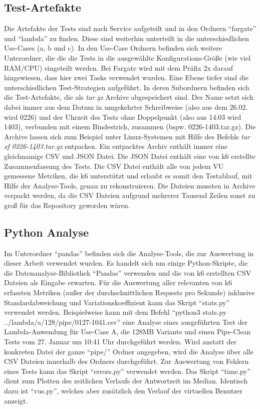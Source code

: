 \subsection{Test-Artefakte}
Die Artefakte der Tests sind nach Service aufgeteilt und in den Ordnern "`fargate"' und "`lambda"' zu finden. Diese sind weiterhin unterteilt in die unterschiedlichen Use-Cases (a, b und c). In den Use-Case Ordnern befinden sich weitere Unterordner, die die die Tests in die ausgewählte Konfigurations-Größe (wie viel RAM/CPU) eingeteilt werden. Bei Fargate wird mit dem Präfix 2x darauf hingewiesen, dass hier zwei Tasks verwendet wurden. Eine Ebene tiefer sind die unterschiedlichen Test-Strategien aufgeführt. In deren Subordnern befinden sich die Test-Artefakte, die als \textit{tar.gz} Archive abgespeichert sind. Der Name setzt sich dabei immer aus dem Datum in umgekehrter Schreibweise (also aus dem 26.02. wird 0226) und der Uhrzeit des Tests ohne Doppelpunkt (also aus 14:03 wird 1403), verbunden mit einem Bindestrich, zusammen (bspw. 0226-1403.tar.gz). Die Archive lassen sich zum Beispiel unter Linux-Systemen mit Hilfe des Befehls \textit{tar xf 0226-1403.tar.gz} entpacken. Ein entpacktes Archiv enthält immer eine gleichnamige \ac{CSV} und JSON Datei. Die JSON Datei enthält eine von k6 erstellte Zusammenfassung des Tests. Die \ac{CSV} Datei enthält alle von jedem \ac{VU} gemessene Metriken, die k6 unterstützt und erlaubt es somit den Testablauf, mit Hilfe der Analyse-Tools, genau zu rekonstruieren. Die Dateien mussten in Archive verpackt werden, da die \ac{CSV} Dateien aufgrund mehrerer Tausend Zeilen sonst zu groß für das Repository geworden wären.

\subsection{Python Analyse} \label{subsec:pandas}
Im Unterordner "`pandas"' befinden sich die Analyse-Tools, die zur Auswertung in dieser Arbeit verwendet wurden. Es handelt sich um einige Python-Skripte, die die Datenanalyse-Bibliothek "`Pandas"' verwenden und die von k6 erstellten \ac{CSV} Dateien als Eingabe erwarten. Für die Auswertung aller relevanten von k6 erfassten Metriken (außer der durchschnittlichen Requests pro Sekunde) inklusive Standardabweichung und Variationskoeffizient kann das Skript "`stats.py"' verwendet werden. Beispielweise kann mit dem Befehl "`python3 stats.py ../lambda/a/128/pipe/0127-1041.csv"' eine Analyse eines ausgeführten Test der Lambda-Anwendung für Use-Case A, die 128MB Variante und einen Pipe-Clean Tests vom 27. Januar um 10:41 Uhr durchgeführt werden. Wird anstatt der konkreten Datei der ganze "`pipe/"' Ordner angegeben, wird die Analyse über alle \ac{CSV} Dateien innerhalb des Ordners durchgeführt. 
Zur Auswertung von Fehlern eines Tests kann das Skript "`errors.py"' verwendet werden. Das Skript "`time.py"' dient zum Plotten des zeitlichen Verlaufs der Antwortzeit im Median. Identisch dazu ist "`vus.py"', welches aber zusätzlich den Verlauf der virtuellen Benutzer anzeigt.

